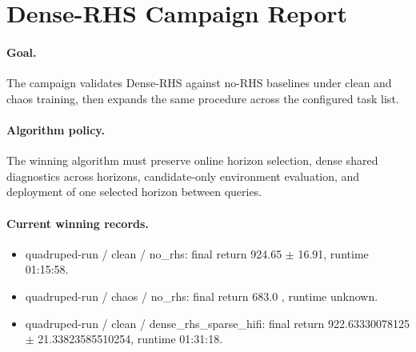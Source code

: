 \section{Dense-RHS Campaign Report}

\paragraph{Goal.}
The campaign validates Dense-RHS against no-RHS baselines under clean and chaos training, then expands the same procedure across the configured task list.

\paragraph{Algorithm policy.}
The winning algorithm must preserve online horizon selection, dense shared diagnostics across horizons, candidate-only environment evaluation, and deployment of one selected horizon between queries.

\paragraph{Current winning records.}
\begin{itemize}
\item quadruped-run / clean / no\_rhs: final return 924.65 $\pm$ 16.91, runtime 01:15:58.
\item quadruped-run / chaos / no\_rhs: final return 683.0 , runtime unknown.
\item quadruped-run / clean / dense\_rhs\_sparse\_hifi: final return 922.63330078125 $\pm$ 21.33823585510254, runtime 01:31:18.
\end{itemize}

